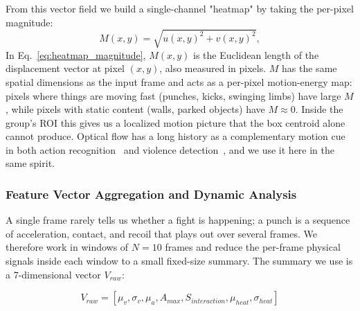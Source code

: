 \documentclass[conference]{IEEEtran}
\begin{document}
From this vector field we build a single-channel "heatmap" by taking the per-pixel magnitude:
\begin{equation}
M(x, y) = \sqrt{u(x, y)^2 + v(x, y)^2},
\label{eq:heatmap_magnitude}
\end{equation}
In Eq.~\ref{eq:heatmap_magnitude}, $M(x, y)$ is the Euclidean length of the displacement vector at pixel $(x, y)$, also measured in pixels. $M$ has the same spatial dimensions as the input frame and acts as a per-pixel motion-energy map: pixels where things are moving fast (punches, kicks, swinging limbs) have large $M$, while pixels with static content (walls, parked objects) have $M \approx 0$. Inside the group's ROI this gives us a localized motion picture that the box centroid alone cannot produce. Optical flow has a long history as a complementary motion cue in both action recognition~\cite{simonyan_two-stream_2014} and violence detection~\cite{gracia_fast_2015}, and we use it here in the same spirit.

\subsubsection{Feature Vector Aggregation and Dynamic Analysis}
A single frame rarely tells us whether a fight is happening; a punch is a sequence of acceleration, contact, and recoil that plays out over several frames. We therefore work in windows of $N = 10$ frames and reduce the per-frame physical signals inside each window to a small fixed-size summary. The summary we use is a 7-dimensional vector $V_{raw}$:

\begin{equation}
V_{raw} = [\mu_v, \sigma_v, \mu_a, A_{max}, S_{interaction}, \mu_{heat}, \sigma_{heat}]
\label{eq:feature_vector}
\end{equation}
\end{document}
